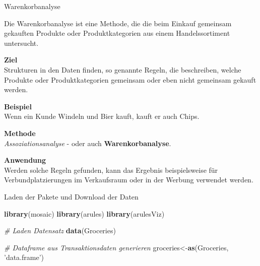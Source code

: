 \documentclass[12pt,ngerman,a4paper,ignorenonframetext,]{beamer}
\newenvironment{Shaded}{\begin{snugshade}}{\end{snugshade}}
\newcommand{\CommentTok}[1]{\textcolor[rgb]{0.56,0.35,0.01}{\textit{#1}}}
\newcommand{\KeywordTok}[1]{\textcolor[rgb]{0.13,0.29,0.53}{\textbf{#1}}}
\newcommand{\NormalTok}[1]{#1}
\newcommand{\StringTok}[1]{\textcolor[rgb]{0.31,0.60,0.02}{#1}}
\begin{document}
\begin{frame}{Warenkorbanalyse}
\protect\hypertarget{warenkorbanalyse-1}{}

Die Warenkorbanalyse ist eine Methode, die die beim Einkauf gemeinsam
gekauften Produkte oder Produktkategorien aus einem Handelssortiment
untersucht.

\textbf{Ziel}\\
Strukturen in den Daten finden, so genannte Regeln, die beschreiben,
welche Produkte oder Produktkategorien gemeinsam oder eben nicht
gemeinsam gekauft werden.

\textbf{Beispiel}\\
Wenn ein Kunde Windeln und Bier kauft, kauft er auch Chips.

\textbf{Methode}\\
\emph{Assoziationsanalyse} - oder auch \textbf{Warenkorbanalyse}.

\textbf{Anwendung}\\
Werden solche Regeln gefunden, kann das Ergebnis beispielsweise für
Verbundplatzierungen im Verkaufsraum oder in der Werbung verwendet
werden.

\end{frame}

\begin{frame}{Laden der Pakete und Download der Daten}
\protect\hypertarget{laden-der-pakete-und-download-der-daten}{}

\begin{Shaded}
\begin{Highlighting}[]
\KeywordTok{library}\NormalTok{(mosaic)}
\KeywordTok{library}\NormalTok{(arules)}
\KeywordTok{library}\NormalTok{(arulesViz)}

\CommentTok{# Laden Datensatz}
\KeywordTok{data}\NormalTok{(Groceries)}

\CommentTok{# Dataframe aus Transaktionsdaten generieren }
\NormalTok{groceries<-}\KeywordTok{as}\NormalTok{(Groceries, }\StringTok{'data.frame'}\NormalTok{)}
\end{Highlighting}
\end{Shaded}

\end{frame}
\end{document}
